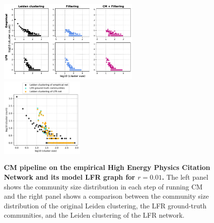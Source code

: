 \documentclass[11pt]{article}   	%
\begin{document}
\begin{figure}[h!]
\centering
\includegraphics[width=0.62\textwidth]{figs/cit_hepph_cm_steps_lfr01.pdf}
\includegraphics[width=0.37\textwidth]{figs/cit_hepph_01_cm_size.pdf}
\caption[CM pipeline on the empirical High Energy Physics Citation network and its model LFR graph for r=0.01]{\textbf{CM pipeline on the empirical High Energy Physics Citation Network and its model LFR graph for $r=0.01$.} The left panel shows the community size distribution in each step of running CM and the right panel shows a comparison between the community size distribution of the original Leiden clustering, the LFR ground-truth communities, and the Leiden clustering of the LFR network.}
\label{fig:hepph-cm-lfr-01}
\end{figure}
\end{document}
